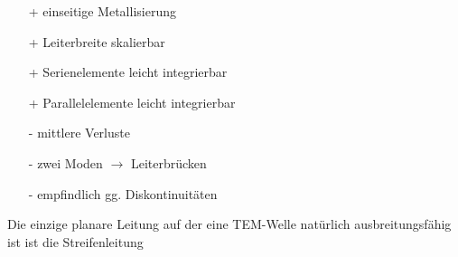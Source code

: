 \documentclass[english]{latex4ei/latex4ei_sheet}
\begin{document}
\begin{sectionbox}
\begin{multicols*}{2}
        \columnbreak
        \begin{itemize}
            \item[+] einseitige Metallisierung
            \item[+] Leiterbreite skalierbar
            \item[+] Serienelemente leicht integrierbar
            \item[+] Parallelelemente leicht integrierbar
            \item[-] mittlere Verluste
            \item[-] zwei Moden $\rightarrow$ Leiterbrücken
            \item[-] empfindlich gg. Diskontinuitäten
        \end{itemize}
    \end{multicols*}

    Die einzige planare Leitung auf der eine TEM-Welle natürlich ausbreitungsfähig ist ist die Streifenleitung

\end{sectionbox}
\end{document}
